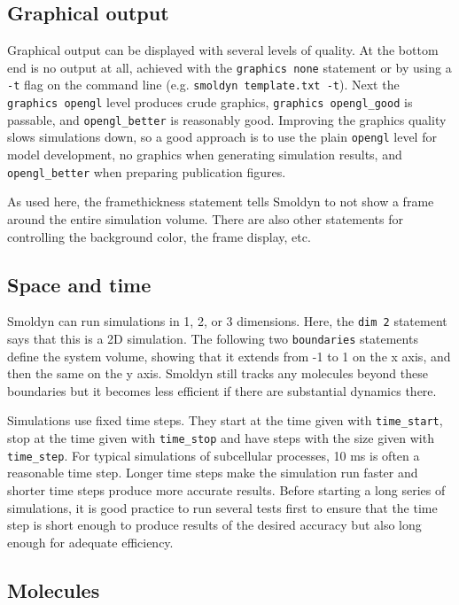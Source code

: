 \documentclass {scrbook}
\newcommand {\ttt} {\texttt}
\begin{document}
\subsection*{Graphical output}

Graphical output can be displayed with several levels of quality. At the bottom end is no output at all, achieved with the  \ttt{graphics none} statement or by using a  \ttt{-t} flag on the command line (e.g.  \ttt{smoldyn template.txt -t}). Next the  \ttt{graphics opengl} level produces crude graphics,  \ttt{graphics opengl\_good} is passable, and  \ttt{opengl\_better} is reasonably good. Improving the graphics quality slows simulations down, so a good approach is to use the plain  \ttt{opengl} level for model development, no graphics when generating simulation results, and  \ttt{opengl\_better} when preparing publication figures.

As used here, the framethickness statement tells Smoldyn to not show a frame around the entire simulation volume. There are also other statements for controlling the background color, the frame display, etc.

\subsection*{Space and time}

Smoldyn can run simulations in 1, 2, or 3 dimensions. Here, the  \ttt{dim 2} statement says that this is a 2D simulation. The following two  \ttt{boundaries} statements define the system volume, showing that it extends from -1 to 1 on the x axis, and then the same on the y axis. Smoldyn still tracks any molecules beyond these boundaries but it becomes less efficient if there are substantial dynamics there.

Simulations use fixed time steps. They start at the time given with  \ttt{time\_start}, stop at the time given with  \ttt{time\_stop} and have steps with the size given with  \ttt{time\_step}. For typical simulations of subcellular processes, 10 ms is often a reasonable time step. Longer time steps make the simulation run faster and shorter time steps produce more accurate results. Before starting a long series of simulations, it is good practice to run several tests first to ensure that the time step is short enough to produce results of the desired accuracy but also long enough for adequate efficiency.

\subsection*{Molecules}
\end{document}
